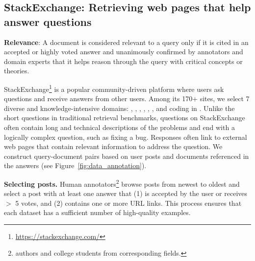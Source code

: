 \subsection{StackExchange: Retrieving web pages that help answer questions}
\label{sec:stackexchange}
\label{sec:StackExchangeAnnotate}
\begin{relevance}
\textbf{Relevance}: A document is considered relevant to a query only if it is cited in an accepted or highly voted answer and unanimously confirmed by annotators and domain experts that it helps reason through the query with critical concepts or theories.
\end{relevance}
StackExchange\footnote{\url{https://stackexchange.com/}} is a popular community-driven platform where users ask questions and receive answers from other users. 
Among its 170+ sites, we select 7 diverse and 
knowledge-intensive domains: \sustainable, \econ, \psychology, \robotics, \earth, \biology, and coding in \stackoverflow. Unlike the short questions in traditional retrieval benchmarks, questions on StackExchange often contain long and technical descriptions of the problems and end with a logically complex question, such as fixing a bug. 
Responses often link to external web pages that contain relevant information to address the question. 
We construct query-document pairs based on user posts and documents referenced in the answers (see Figure~\ref{fig:data_annotation}). 


\textbf{Selecting posts.} Human annotators\footnote{authors and college students from corresponding fields.} browse posts from newest to oldest and select a post with at least one answer that (1) is accepted by the user or receives $>$ 5 votes, and (2) contains one or more URL links. This process ensures that each dataset has a sufficient number of high-quality examples.


